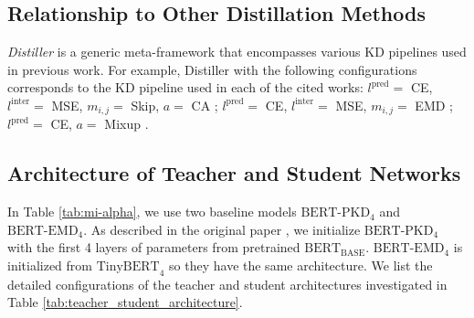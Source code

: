 \documentclass[11pt]{article}
\begin{document}
\subsection{Relationship to Other Distillation Methods}
\label{subsec:distiller_search_space}
\emph{Distiller} is a generic meta-framework that encompasses various KD pipelines used in previous work. For example, Distiller with the following configurations corresponds to the KD pipeline used in each of the cited works: 
$l^{\text{pred}} =$ CE, $l^{\text{inter}}=$ MSE, $m_{i,j} = $ Skip, $a = $ CA  \citep{jiao2019tinybert}; 
$l^{\text{pred}} =$ CE, $l^{\text{inter}}=$ MSE, $m_{i,j} = $ EMD \citep{li2020bert}; 
$l^{\text{pred}} =$ CE, $a = $ Mixup  \citep{liang2020mixkd}.
\subsection{Architecture of Teacher and Student Networks}
\label{sec:app:netarch}
In Table \ref{tab:mi-alpha}, we use two baseline models $\text{BERT-PKD}_4$ and $\text{BERT-EMD}_4$. As described in the original paper \citep{sun2019patient}, we initialize $\text{BERT-PKD}_4$ with the first 4 layers of parameters from pretrained $\text{BERT}_\text{BASE}$. $\text{BERT-EMD}_4$ is initialized from $\text{TinyBERT}_4$ so they have the same architecture.
We list the detailed configurations of the teacher and student architectures investigated in Table \ref{tab:teacher_student_architecture}.
\end{document}
